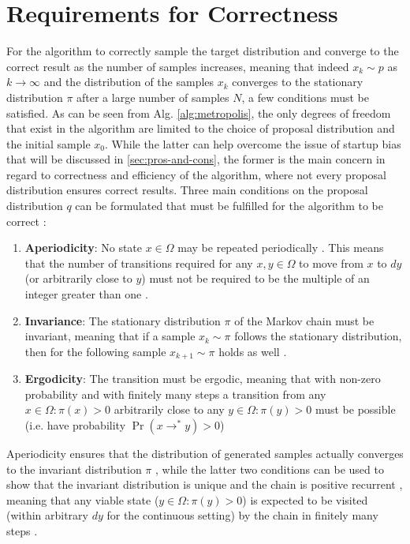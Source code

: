 \documentclass[oneside, a4paper]{article}
\newcommand\br[1]{\left(#1\right)}
\begin{document}
\section{Requirements for Correctness}
For the algorithm to correctly sample the target distribution and converge to the correct result as the number of samples increases, meaning that indeed $x_k \sim p$ as $k\to\infty$ and the distribution of the samples $x_k$ converges to the stationary distribution $\pi$ after a large number of samples $N$, a few conditions must be satisfied. As can be seen from Alg. \ref{alg:metropolis}, the only degrees of freedom that exist in the algorithm are limited to the choice of proposal distribution and the initial sample $x_0$. While the latter can help overcome the issue of startup bias that will be discussed in \autoref{sec:pros-and-cons}, the former is the main concern in regard to correctness and efficiency of the algorithm, where not every proposal distribution ensures correct results. Three main conditions on the proposal distribution $q$ can be formulated that must be fulfilled for the algorithm to be correct \autocite{survey}:
\begin{enumerate}
  \item \textbf{Aperiodicity}: No state $x\in\Omega$ may be repeated periodically \autocite{survey}. This means that the number of transitions required for any $x,y\in\Omega$ to move from $x$ to $dy$ (or arbitrarily close to $y$) must not be required to be the multiple of an integer greater than one \autocite{understanding-mh-chib-greenberg}.
  \item \textbf{Invariance}: The stationary distribution $\pi$ of the Markov chain must be invariant, meaning that if a sample $x_k \sim \pi$ follows the stationary distribution, then for the following sample $x_{k+1} \sim \pi$  holds as well \autocite{survey}.
  \item \textbf{Ergodicity}: The transition must be ergodic, meaning that with non-zero probability and with finitely many steps a transition from any $x\in\Omega: \pi(x)>0$ arbitrarily close to any $y\in\Omega: \pi(y)>0$ must be possible (i.e. have probability $\Pr\br{x\to^* y} >0$)
\end{enumerate}

Aperiodicity ensures that the distribution of generated samples actually converges to the invariant distribution $\pi$ \autocite{survey}, while the latter two conditions can be used to show that the invariant distribution is unique and the chain is positive recurrent \autocite{survey}, meaning that any viable state ($y\in\Omega: \pi(y)>0$) is expected to be visited (within arbitrary $dy$ for the continuous setting) by the chain in finitely many steps \autocite{survey}.
\end{document}
